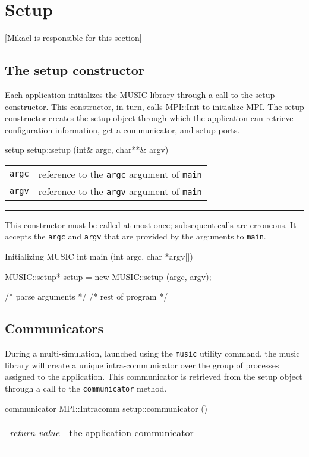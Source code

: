 \documentclass[a4paper]{report}
\makeatletter
\newenvironment{parameters}%
{\begin{tabular}{@{\hspace{2em}}lp{0.6\textwidth}}}%
{\end{tabular}\par\vspace{1mm}\par\hrule\par\vspace{5mm}}
\newcommand{\responsible}[1]%
{{\color{red}[#1 is responsible for this section]}}
\makeatother
\begin{document}
\section{Setup}
\responsible{Mikael}

\subsection{The setup constructor}

Each application initializes the MUSIC library through a call to the
setup constructor.  This constructor, in turn, calls MPI::Init to
initialize MPI.  The setup constructor creates the setup object
through which the application can retrieve configuration information,
get a communicator, and setup ports.

\begin{head}{setup}
  setup::setup (int& argc, char**& argv)
\end{head}
\begin{parameters}
  \lstinline|argc| &%
  reference to the \lstinline|argc| argument of \lstinline|main| \\
  \lstinline|argv| &%
  reference to the \lstinline|argv| argument of \lstinline|main| \\
\end{parameters}

This constructor must be called at most once; subsequent calls are
erroneous.  It accepts the \lstinline|argc| and \lstinline|argv| that are
provided by the arguments to \lstinline|main|.

\begin{code}{Initializing MUSIC}
int main (int argc, char *argv[])
{
  MUSIC::setup* setup = new MUSIC::setup (argc, argv);

  /* parse arguments */
  /* rest of program */
}
\end{code}

\subsection{Communicators}

During a multi-simulation, launched using the \lstinline|music| utility
command, the music library will create a unique intra-communicator
over the group of processes assigned to the application.  This
communicator is retrieved from the setup object through a call to the
\lstinline|communicator| method.

\begin{head}{communicator}
  MPI::Intracomm setup::communicator ()
\end{head}
\begin{parameters}
  \emph{return value} & the application communicator \\
\end{parameters}
\end{document}
